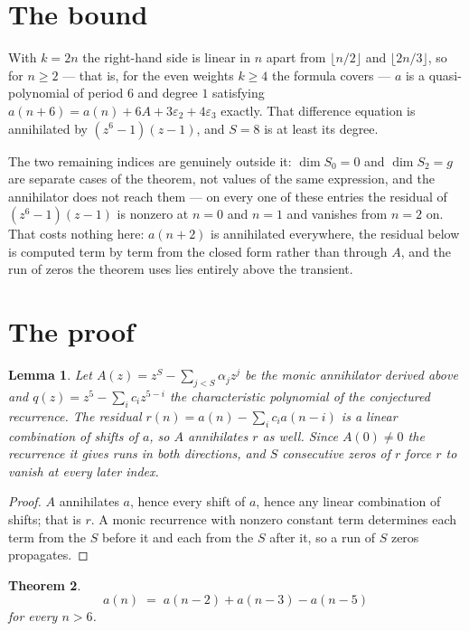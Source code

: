 \documentclass[11pt,a4paper]{article}
\theoremstyle{plain}
\newtheorem{theorem}{Theorem}
\newtheorem{lemma}[theorem]{Lemma}
\theoremstyle{definition}
\begin{document}
\section{The bound}

With $k=2n$ the right-hand side is linear in $n$ apart from $\lfloor n/2\rfloor$ and
$\lfloor 2n/3\rfloor$, so for $n\ge2$ --- that is, for the even weights $k\ge4$ the formula
covers --- $a$ is a quasi-polynomial of period $6$ and degree $1$ satisfying
$a(n+6)=a(n)+6A+3\varepsilon_2+4\varepsilon_3$ exactly. That difference equation is annihilated
by $(z^6-1)(z-1)$, and $S=8$ is at least its degree.

The two remaining indices are genuinely outside it: $\dim S_0=0$ and $\dim S_2=g$ are separate
cases of the theorem, not values of the same expression, and the annihilator does not reach
them --- on every one of these entries the residual of $(z^6-1)(z-1)$ is nonzero at $n=0$ and
$n=1$ and vanishes from $n=2$ on. That costs nothing here: $a(n+2)$ is annihilated everywhere,
the residual below is computed term by term from the closed form rather than through $A$, and
the run of zeros the theorem uses lies entirely above the transient.

\section{The proof}

\begin{lemma}\label{lem:crit}
Let $A(z)=z^S-\sum_{j<S}\alpha_jz^{j}$ be the monic annihilator derived above and
$q(z)=z^{5}-\sum_ic_iz^{5-i}$ the characteristic polynomial of the conjectured
recurrence. The residual $r(n)=a(n)-\sum_ic_ia(n-i)$ is a linear combination of shifts of $a$,
so $A$ annihilates $r$ as well. Since $A(0)\ne0$ the recurrence it gives runs in both
directions, and $S$ consecutive zeros of $r$ force $r$ to vanish at every later index.
\end{lemma}

\begin{proof}
$A$ annihilates $a$, hence every shift of $a$, hence any linear combination of shifts; that is
$r$. A monic recurrence with nonzero constant term determines each term from the $S$ before it
and each from the $S$ after it, so a run of $S$ zeros propagates.
\end{proof}

\begin{theorem}
\[
a(n)\;=\;a(n-2) + a(n-3) - a(n-5)
\]
for every $n>6$.
\end{theorem}
\end{document}
